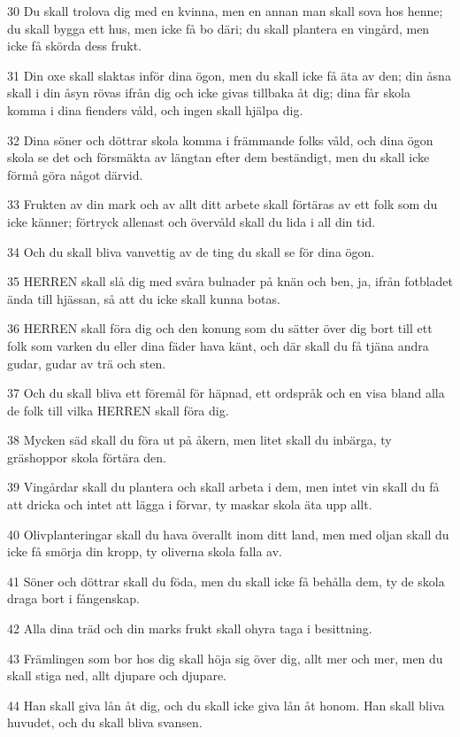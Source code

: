 \par 30 Du skall trolova dig med en kvinna, men en annan man skall sova hos henne; du skall bygga ett hus, men icke få bo däri; du skall plantera en vingård, men icke få skörda dess frukt.
\par 31 Din oxe skall slaktas inför dina ögon, men du skall icke få äta av den; din åsna skall i din åsyn rövas ifrån dig och icke givas tillbaka åt dig; dina får skola komma i dina fienders våld, och ingen skall hjälpa dig.
\par 32 Dina söner och döttrar skola komma i främmande folks våld, och dina ögon skola se det och försmäkta av längtan efter dem beständigt, men du skall icke förmå göra något därvid.
\par 33 Frukten av din mark och av allt ditt arbete skall förtäras av ett folk som du icke känner; förtryck allenast och övervåld skall du lida i all din tid.
\par 34 Och du skall bliva vanvettig av de ting du skall se för dina ögon.
\par 35 HERREN skall slå dig med svåra bulnader på knän och ben, ja, ifrån fotbladet ända till hjässan, så att du icke skall kunna botas.
\par 36 HERREN skall föra dig och den konung som du sätter över dig bort till ett folk som varken du eller dina fäder hava känt, och där skall du få tjäna andra gudar, gudar av trä och sten.
\par 37 Och du skall bliva ett föremål för häpnad, ett ordspråk och en visa bland alla de folk till vilka HERREN skall föra dig.
\par 38 Mycken säd skall du föra ut på åkern, men litet skall du inbärga, ty gräshoppor skola förtära den.
\par 39 Vingårdar skall du plantera och skall arbeta i dem, men intet vin skall du få att dricka och intet att lägga i förvar, ty maskar skola äta upp allt.
\par 40 Olivplanteringar skall du hava överallt inom ditt land, men med oljan skall du icke få smörja din kropp, ty oliverna skola falla av.
\par 41 Söner och döttrar skall du föda, men du skall icke få behålla dem, ty de skola draga bort i fångenskap.
\par 42 Alla dina träd och din marks frukt skall ohyra taga i besittning.
\par 43 Främlingen som bor hos dig skall höja sig över dig, allt mer och mer, men du skall stiga ned, allt djupare och djupare.
\par 44 Han skall giva lån åt dig, och du skall icke giva lån åt honom. Han skall bliva huvudet, och du skall bliva svansen.
